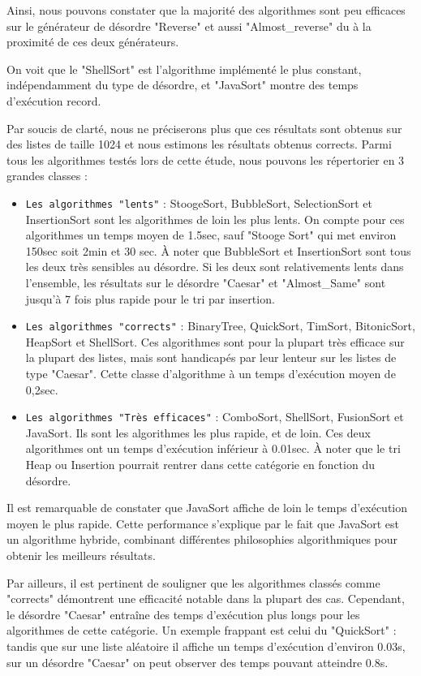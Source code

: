 \documentclass[a4paper,12pt]{article}
\begin{document}
Ainsi, nous pouvons constater que la majorité des algorithmes sont peu efficaces sur le générateur de désordre "Reverse" et aussi "Almost\_reverse" du à la proximité de ces deux générateurs.

On voit que le "ShellSort" est l'algorithme implémenté le plus constant, indépendamment du type de désordre, et "JavaSort" montre des temps d'exécution record.

\vspace{0.5cm}
Par soucis de clarté, nous ne préciserons plus que ces résultats sont obtenus sur des listes de taille 1024 et nous estimons les résultats obtenus corrects.
\newline
Parmi tous les algorithmes testés lors de cette étude, nous pouvons les répertorier en 3 grandes classes :
\begin{itemize}
    \item \texttt{Les algorithmes "lents"} : StoogeSort, BubbleSort, SelectionSort et InsertionSort sont les algorithmes de loin les plus lents. On compte pour ces algorithmes un temps moyen de 1.5sec, sauf "Stooge Sort" qui met environ 150sec soit 2min et 30 sec. À noter que BubbleSort et InsertionSort sont tous les deux très sensibles au désordre. Si les deux sont relativements lents dans l'ensemble, les résultats sur le désordre "Caesar" et "Almost\_Same" sont jusqu'à 7 fois plus rapide pour le tri par insertion.  
    \item \texttt{Les algorithmes "corrects"} : BinaryTree, QuickSort, TimSort, BitonicSort, HeapSort et ShellSort. Ces algorithmes sont pour la plupart très efficace sur la plupart des listes, mais sont handicapés par leur lenteur sur les listes de type "Caesar". Cette classe d'algorithme à un temps d'exécution moyen de 0,2sec.
    \item \texttt{Les algorithmes "Très efficaces"} : ComboSort, ShellSort, FusionSort et JavaSort. Ils sont les algorithmes les plus rapide, et de loin. Ces deux algorithmes ont un temps d'exécution inférieur à  0.01sec. À noter que le tri Heap ou Insertion pourrait rentrer dans cette catégorie en fonction du désordre. 
    \end{itemize}
    
    Il est remarquable de constater que JavaSort affiche de loin le temps d'exécution moyen le plus rapide. Cette performance s'explique par le fait que JavaSort est un algorithme hybride, combinant différentes philosophies algorithmiques pour obtenir les meilleurs résultats.
    
    Par ailleurs, il est pertinent de souligner que les algorithmes classés comme "corrects" démontrent une efficacité notable dans la plupart des cas. Cependant, le désordre "Caesar" entraîne des temps d'exécution plus longs pour les algorithmes de cette catégorie. Un exemple frappant est celui du "QuickSort" : tandis que sur une liste aléatoire il affiche un temps d'exécution d'environ 0.03s, sur un désordre "Caesar" on peut observer des temps pouvant atteindre 0.8s.
        
\end{document}
